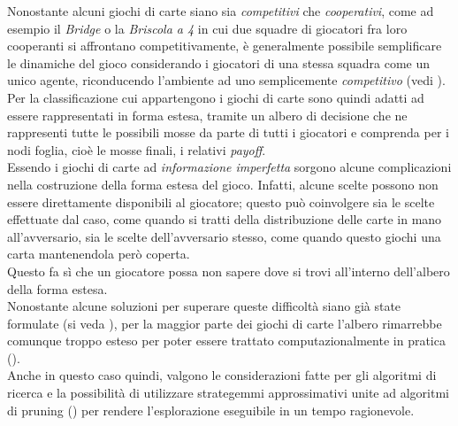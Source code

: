 Nonostante alcuni giochi di carte siano sia \emph{competitivi} che \emph{cooperativi}, come ad esempio il \emph{Bridge} o la \emph{Briscola a 4} in cui due squadre di giocatori fra loro cooperanti si affrontano competitivamente, è generalmente possibile semplificare le dinamiche del gioco considerando i giocatori di una stessa squadra come un unico agente, riconducendo l'ambiente ad uno semplicemente \emph{competitivo} (vedi \cite{pavel}).\\

Per la classificazione cui appartengono i giochi di carte sono quindi adatti ad essere rappresentati in forma estesa, tramite un albero di decisione che ne rappresenti tutte le possibili mosse da parte di tutti i giocatori e comprenda per i nodi foglia, cioè le mosse finali, i relativi \emph{payoff}.\\

Essendo i giochi di carte ad \emph{informazione imperfetta} sorgono alcune complicazioni nella costruzione della forma estesa del gioco.
Infatti, alcune scelte possono non essere direttamente disponibili al giocatore; questo può coinvolgere sia le scelte effettuate dal caso, come quando si tratti della distribuzione delle carte in mano all'avversario, sia le scelte dell'avversario stesso, come quando questo giochi una carta mantenendola però coperta.\\
Questo fa sì che un giocatore possa non sapere dove si trovi all'interno dell'albero della forma estesa.\\
Nonostante alcune soluzioni per superare queste difficoltà siano già state formulate (si veda \cite{wiley}), per la maggior parte dei giochi di carte l'albero rimarrebbe comunque troppo esteso per poter essere trattato computazionalmente in pratica (\cite{frank}).\\
Anche in questo caso quindi, valgono le considerazioni fatte per gli algoritmi di ricerca e la possibilità di utilizzare strategemmi approssimativi unite ad algoritmi di pruning (\cite{pavel}) per rendere l'esplorazione eseguibile in un tempo ragionevole.

